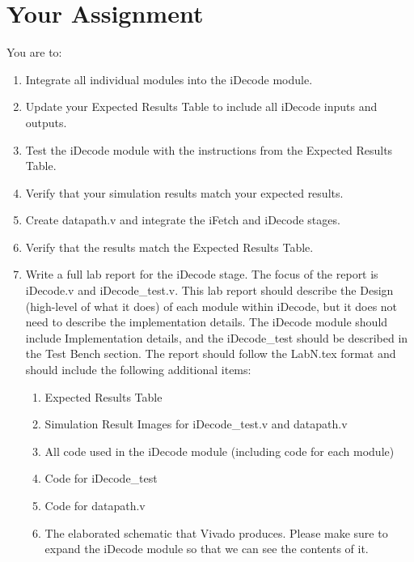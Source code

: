 \section{Your Assignment}

You are to:
\begin{enumerate}
\item Integrate all individual modules into the iDecode module.
\item Update your Expected Results Table to include all iDecode inputs and outputs.
\item Test the iDecode module with the instructions from the Expected Results Table.
\item Verify that your simulation results match your expected results.
\item Create datapath.v and integrate the iFetch and iDecode stages.
\item Verify that the results match the Expected Results Table.
\item Write a full lab report for the iDecode stage.  The focus of the report is iDecode.v and iDecode\_test.v.  This lab report should describe the Design (high-level of what it does) of each module within iDecode, but it does not need to describe the implementation details. The iDecode module should include Implementation details, and the iDecode\_test should be described in the Test Bench section.  The report should follow the LabN.tex format and should include the following additional items:
\begin{enumerate}
	\item Expected Results Table
	\item Simulation Result Images for iDecode\_test.v and datapath.v
	\item All code used in the iDecode module (including code for each module) 
	\item Code for iDecode\_test
	\item Code for datapath.v
	\item The elaborated schematic that Vivado produces.  Please make sure to expand the iDecode module so that we can see the contents of it.
\end{enumerate}
\end{enumerate} 